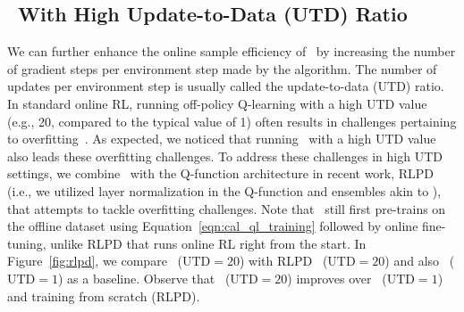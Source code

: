 \vspace{-0.1cm}
\subsection{\methodname\ With High Update-to-Data (UTD) Ratio}
\label{subsec:highutd}
\vspace{-0.2cm}


We can further enhance the online sample efficiency of \methodname\ by increasing the number of gradient steps per environment step made by the algorithm. The number of updates per environment step is usually called the update-to-data (UTD) ratio.
In standard online RL, running off-policy Q-learning with a high UTD value (e.g., 20, compared to the typical value of 1) often results in challenges pertaining to overfitting~\citep{li2023efficient, redq, rlpd, replaybarrier}. As expected, we noticed that running \methodname\ with a high UTD value also leads these overfitting challenges. To address these challenges in high UTD settings, we combine \methodname\ with the Q-function architecture in recent work, RLPD~\citep{rlpd} (i.e., we utilized layer normalization in the Q-function and ensembles akin to \citep{redq}), that attempts to tackle overfitting challenges. Note that \methodname\ still first pre-trains on the offline dataset using Equation~\ref{eqn:cal_ql_training} followed by online fine-tuning, unlike RLPD that runs online RL right from the start.
In Figure~\ref{fig:rlpd}, we compare \methodname\ ($\text{UTD}=20$) with RLPD~\cite{rlpd} ($\text{UTD}=20$) and also \methodname\ ($\text{UTD}=1$) as a baseline. Observe that \methodname\ ($\text{UTD}=20$) improves over \methodname\ ($\text{UTD}=1$) and training from scratch (RLPD).   

\iffalse

